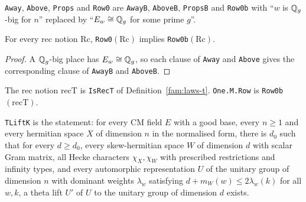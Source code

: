 \begin{definition}\label{fam:row0}
\texttt{Away}, \texttt{Above}, \texttt{Props} and \texttt{Row0} are \texttt{AwayB}, \texttt{AboveB}, \texttt{PropsB} and \texttt{Row0b} with ``$w$ is $\mathbb{Q}_g$-big for $n$'' replaced by ``$E_w\cong\mathbb{Q}_g$ for some prime $g$''.
\end{definition}

\begin{lemma}\label{fam:row0-row0b}
For every rec notion $\mathrm{Rc}$, \texttt{Row0}$(\mathrm{Rc})$ implies \texttt{Row0b}$(\mathrm{Rc})$.
\end{lemma}
\begin{proof}
A $\mathbb{Q}_g$-big place has $E_w\cong\mathbb{Q}_g$, so each clause of \texttt{Away} and \texttt{Above} gives the corresponding clause of \texttt{AwayB} and \texttt{AboveB}.
\end{proof}

\begin{definition}\label{fam:one-m-row}
The rec notion $\mathrm{recT}$ is \texttt{IsRecT} of Definition~\ref{fam:laws-t}. \texttt{One.M.Row} is \texttt{Row0b}$(\mathrm{recT})$.
\end{definition}

\begin{definition}\label{fam:tlift-k}
\texttt{TLiftK} is the statement: for every CM field $E$ with a good base, every $n\ge1$ and every hermitian space $X$ of dimension $n$ in the normalised form, there is $d_0$ such that for every $d\ge d_0$, every skew-hermitian space $W$ of dimension $d$ with scalar Gram matrix, all Hecke characters $\chi_X,\chi_W$ with prescribed restrictions and infinity types, and every automorphic representation $U$ of the unitary group of dimension $n$ with dominant weights $\lambda_w$ satisfying $d+m_W(w)\le 2\lambda_w(k)$ for all $w,k$, a theta lift $U'$ of $U$ to the unitary group of dimension $d$ exists.
\end{definition}

